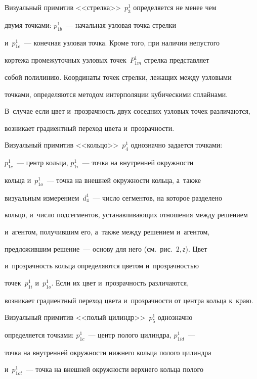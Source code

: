   


  Визуальный примитив <<стрелка>>~$p^1_3$ определяется не менее чем 


двумя точками: $p^1_{1b}$~--- начальная узловая точка стрелки 


и~$p^1_{1e}$~--- конечная узловая точка. Кроме того, при наличии непустого 


кортежа промежуточных узловых точек~$P^1_{1m}$ стрелка представляет 


собой полилинию. Координаты точек стрелки, лежащих между узловыми 


точками, определяются методом интерполяции кубическими сплайнами. 


В~случае если цвет и~прозрачность двух соседних узловых точек различаются, 


возникает градиентный переход цвета и~прозрачности.


  


  Визуальный примитив <<кольцо>>~$p_4^1$ однозначно задается точками: 


$p^1_{1c}$~--- центр кольца, $p^1_{1i}$~--- точка на внутренней окружности 


кольца и~$p^1_{1o}$~--- точка на внешней окружности кольца, а~также 


визуальным измерением~$d_4^1$~--- число сегментов, на которое разделено 


кольцо, и~число подсегментов, устанавли\-ва\-ющих отношения между решением 


и~агентом, получившим его, а~также между решением и~агентом, 


предложившим решение~--- основу для него (см.\ рис.~2,\,\textit{г}). Цвет 


и~прозрачность кольца определяются цветом и~прозрачностью 


точек~$p^1_{1i}$ и~$p^1_{1o}$. Если их цвет и~прозрачность различаются, 


возникает градиентный переход цвета и~прозрачности от центра кольца к~краю.


  


  Визуальный примитив <<полый цилиндр>>~$p^1_5$ однозначно 


определяется точками: $p^1_{1c}$~--- центр полого цилиндра, $p^1_{1id}$~--- 


точка на внутренней окружности нижнего кольца полого цилиндра 


и~$p^1_{1ot}$~--- точка на внешней окружности верхнего кольца полого 


